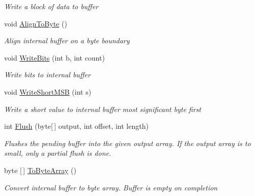 \begin{DoxyCompactItemize}
\begin{DoxyCompactList}\small\item\em Write a block of data to buffer \end{DoxyCompactList}\item 
void \hyperlink{class_i_c_sharp_code_1_1_sharp_zip_lib_1_1_zip_1_1_compression_1_1_pending_buffer_a27eda8aa6361ec5b0123a1f6e359008f}{Align\+To\+Byte} ()
\begin{DoxyCompactList}\small\item\em Align internal buffer on a byte boundary \end{DoxyCompactList}\item 
void \hyperlink{class_i_c_sharp_code_1_1_sharp_zip_lib_1_1_zip_1_1_compression_1_1_pending_buffer_a64bcba2bec299128150f13ba0afeec76}{Write\+Bits} (int b, int count)
\begin{DoxyCompactList}\small\item\em Write bits to internal buffer \end{DoxyCompactList}\item 
void \hyperlink{class_i_c_sharp_code_1_1_sharp_zip_lib_1_1_zip_1_1_compression_1_1_pending_buffer_acb454c89e12f3795c186255ed5d950ab}{Write\+Short\+M\+SB} (int s)
\begin{DoxyCompactList}\small\item\em Write a short value to internal buffer most significant byte first \end{DoxyCompactList}\item 
int \hyperlink{class_i_c_sharp_code_1_1_sharp_zip_lib_1_1_zip_1_1_compression_1_1_pending_buffer_a11c98151c04ba844b487b76e7b89d2a7}{Flush} (byte\mbox{[}$\,$\mbox{]} output, int offset, int length)
\begin{DoxyCompactList}\small\item\em Flushes the pending buffer into the given output array. If the output array is to small, only a partial flush is done. \end{DoxyCompactList}\item 
byte \mbox{[}$\,$\mbox{]} \hyperlink{class_i_c_sharp_code_1_1_sharp_zip_lib_1_1_zip_1_1_compression_1_1_pending_buffer_af92ff9798b6fad3d99ae1aa2ed9a4e67}{To\+Byte\+Array} ()
\begin{DoxyCompactList}\small\item\em Convert internal buffer to byte array. Buffer is empty on completion \end{DoxyCompactList}\end{DoxyCompactItemize}
